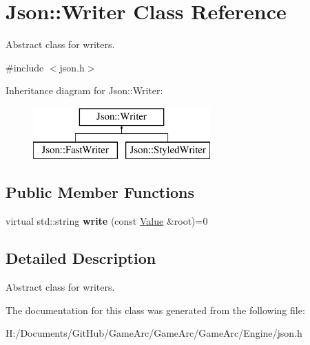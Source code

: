 \hypertarget{class_json_1_1_writer}{\section{Json\+:\+:Writer Class Reference}
\label{class_json_1_1_writer}
}


Abstract class for writers.  




{\ttfamily \#include $<$json.\+h$>$}

Inheritance diagram for Json\+:\+:Writer\+:\begin{figure}[H]
\begin{center}
\leavevmode
\includegraphics[height=2.000000cm]{class_json_1_1_writer}
\end{center}
\end{figure}
\subsection*{Public Member Functions}
\begin{DoxyCompactItemize}
\item 
\hypertarget{class_json_1_1_writer_a7b2273a4ffd6f32b369ac8a53b7b5a0d}{virtual std\+::string {\bfseries write} (const \hyperlink{class_json_1_1_value}{Value} \&root)=0}\label{class_json_1_1_writer_a7b2273a4ffd6f32b369ac8a53b7b5a0d}

\end{DoxyCompactItemize}


\subsection{Detailed Description}
Abstract class for writers. 

The documentation for this class was generated from the following file\+:\begin{DoxyCompactItemize}
\item 
H\+:/\+Documents/\+Git\+Hub/\+Game\+Arc/\+Game\+Arc/\+Game\+Arc/\+Engine/json.\+h\end{DoxyCompactItemize}
